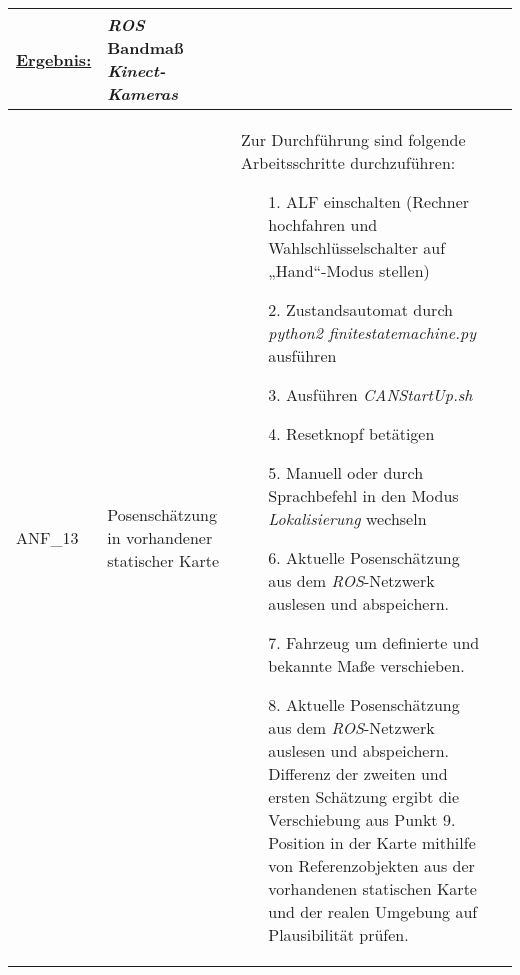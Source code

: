\documentclass[12pt,a4paper,oneside,numbers=noenddot,captions=tableheading,toc=bibliography,openany,tikz,margin=5mm]{scrbook}
\begin{document}
\begin{longtable}{|p{}|p{}|p{7cm}|p{}|}
	\underline{Ergebnis:}\newline
	\newline
	\textbf{}%
	& \textit{ROS}\newline
	Bandmaß\newline
	\textit{Kinect-Kameras}
	\\
	\hline
	ANF\_13&Posenschätzung in vorhandener statischer Karte & Zur Durchführung sind folgende Arbeitsschritte durchzuführen:
	\begin{itemize}
		\item[1.]	ALF einschalten (Rechner hochfahren und Wahlschlüsselschalter auf „Hand“-Modus stellen)
		\item[2.]	Zustandsautomat durch \textit{python2 finitestatemachine.py} ausführen
		\item[3.]	Ausführen \textit{CANStartUp.sh}
		\item[4.]	Resetknopf betätigen
		\item[5.]	Manuell oder durch Sprachbefehl in den Modus \textit{\textit{Lokalisierung}} wechseln
		\item[6.]	Aktuelle Posenschätzung aus dem \textit{ROS}-Netzwerk auslesen und abspeichern.
		\item[7.]	Fahrzeug um definierte und bekannte Maße verschieben.
		\item[8.]	Aktuelle Posenschätzung aus dem \textit{ROS}-Netzwerk auslesen und abspeichern. Differenz der zweiten und ersten Schätzung ergibt die Verschiebung aus Punkt 9. Position in der Karte mithilfe von Referenzobjekten aus der vorhandenen statischen Karte und der realen Umgebung auf Plausibilität prüfen.
	\end{itemize}
	

\end{longtable}
\end{document}
